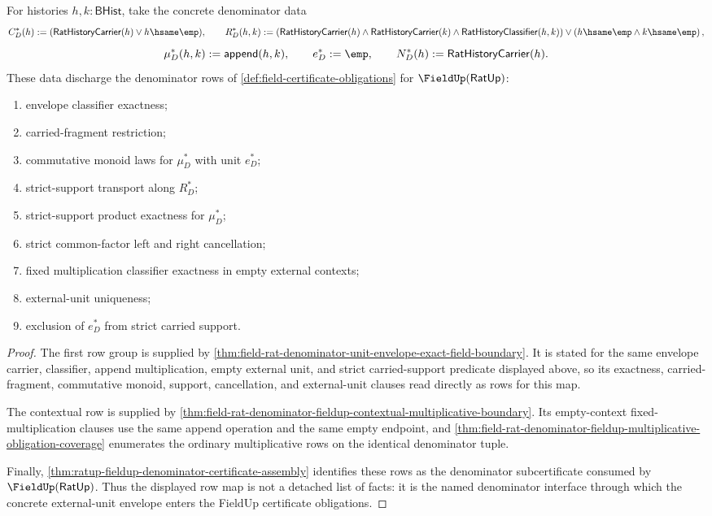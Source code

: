 \begin{theorem}
\label{thm:ratup-fieldup-denominator-obligation-map}
For histories $h,k:\mathsf{BHist}$, take the concrete denominator data
$$
C_D^\ast(h):=(\mathsf{RatHistoryCarrier}(h)\lor h\hsame\emp),
\qquad
R_D^\ast(h,k):=
\left(
\mathsf{RatHistoryCarrier}(h)\land
\mathsf{RatHistoryCarrier}(k)\land
\mathsf{RatHistoryClassifier}(h,k)
\right)
\lor
\left(h\hsame\emp\land k\hsame\emp\right),
$$
$$
\mu_D^\ast(h,k):=\mathsf{append}(h,k),\qquad
e_D^\ast:=\emp,\qquad
N_D^\ast(h):=\mathsf{RatHistoryCarrier}(h).
$$
These data discharge the denominator rows of
\autoref{def:field-certificate-obligations} for $\FieldUp(\mathsf{RatUp})$:
\begin{enumerate}
  \item envelope classifier exactness;
  \item carried-fragment restriction;
  \item commutative monoid laws for $\mu_D^\ast$ with unit $e_D^\ast$;
  \item strict-support transport along $R_D^\ast$;
  \item strict-support product exactness for $\mu_D^\ast$;
  \item strict common-factor left and right cancellation;
  \item fixed multiplication classifier exactness in empty external contexts;
  \item external-unit uniqueness;
  \item exclusion of $e_D^\ast$ from strict carried support.
\end{enumerate}
\end{theorem}
\begin{proof}
The first row group is supplied by
\autoref{thm:field-rat-denominator-unit-envelope-exact-field-boundary}. It is
stated for the same envelope carrier, classifier, append multiplication, empty
external unit, and strict carried-support predicate displayed above, so its
exactness, carried-fragment, commutative monoid, support, cancellation, and
external-unit clauses read directly as rows for this map.

The contextual row is supplied by
\autoref{thm:field-rat-denominator-fieldup-contextual-multiplicative-boundary}.
Its empty-context fixed-multiplication clauses use the same append operation and
the same empty endpoint, and
\autoref{thm:field-rat-denominator-fieldup-multiplicative-obligation-coverage}
enumerates the ordinary multiplicative rows on the identical denominator tuple.

Finally,
\autoref{thm:ratup-fieldup-denominator-certificate-assembly} identifies these
rows as the denominator subcertificate consumed by
$\FieldUp(\mathsf{RatUp})$. Thus the displayed row map is not a detached list of
facts: it is the named denominator interface through which the concrete
external-unit envelope enters the FieldUp certificate obligations.
\end{proof}

